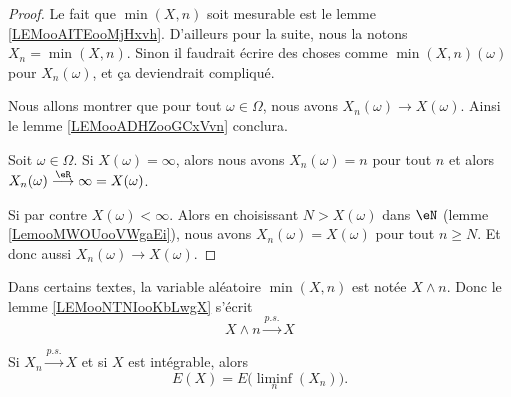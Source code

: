 \begin{proof}
	Le fait que \( \min(X,n)\) soit mesurable est le lemme \ref{LEMooAITEooMjHxvh}. D'ailleurs pour la suite, nous la notons \( X_n=\min(X,n)\). Sinon il faudrait écrire des choses comme \( \min(X,n)(\omega)\) pour \( X_n(\omega)\), et ça deviendrait compliqué.

	Nous allons montrer que pour tout \( \omega\in \Omega\), nous avons \( X_n(\omega)\to X(\omega)\). Ainsi le lemme \ref{LEMooADHZooGCxVvn} conclura.

	Soit \( \omega\in\Omega\). Si \( X(\omega)=\infty\), alors nous avons \( X_n(\omega)=n\) pour tout \( n\) et alors \( X_n(\omega)\stackrel{\eR}{\longrightarrow}\infty=X(\omega)\).

	Si par contre \( X(\omega)<\infty\). Alors en choisissant \( N>X(\omega)\) dans \( \eN\) (lemme \ref{LemooMWOUooVWgaEi}), nous avons \( X_n(\omega)=X(\omega)\) pour tout \( n\geq N\). Et donc aussi \( X_n(\omega)\to X(\omega)\).
\end{proof}

\begin{normaltext}
	Dans certains textes, la variable aléatoire \( \min(X,n)\) est notée \( X\wedge n\). Donc le lemme \ref{LEMooNTNIooKbLwgX} s'écrit
	\begin{equation}
		X\wedge n\stackrel{p.s.}{\longrightarrow}X
	\end{equation}
\end{normaltext}

\begin{proposition}	\label{PROPooDWTWooPygbmK}
	Si \( X_n\stackrel{ p.s.}{\longrightarrow} X\) et si \( X\) est intégrable, alors
	\begin{equation}
		E(X)=E\big( \liminf_n(X_n) \big).
	\end{equation}
\end{proposition}

